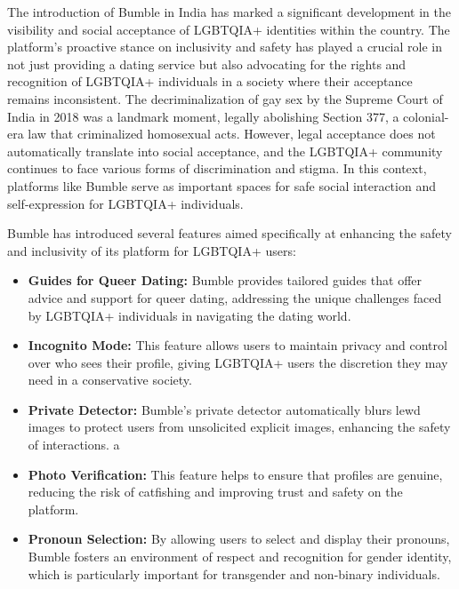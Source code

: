The introduction of Bumble in India has marked a significant development in the visibility and social acceptance of LGBTQIA+ identities within the country. The platform’s proactive stance on inclusivity and safety has played a crucial role in not just providing a dating service but also advocating for the rights and recognition of LGBTQIA+ individuals in a society where their acceptance remains inconsistent. The decriminalization of gay sex by the Supreme Court of India in 2018 \cite{Johar} was a landmark moment, legally abolishing Section 377, a colonial-era law that criminalized homosexual acts. However, legal acceptance does not automatically translate into social acceptance, and the LGBTQIA+ community continues to face various forms of discrimination and stigma. In this context, platforms like Bumble serve as important spaces for safe social interaction and self-expression for LGBTQIA+ individuals.

Bumble has introduced several features aimed specifically at enhancing the safety and inclusivity of its platform for LGBTQIA+ users:

\begin{itemize}
    \item \textbf{Guides for Queer Dating:} Bumble provides tailored guides that offer advice and support for queer dating, addressing the unique challenges faced by LGBTQIA+ individuals in navigating the dating world. \cite{Bumble}
    \item \textbf{Incognito Mode:} This feature allows users to maintain privacy and control over who sees their profile, giving LGBTQIA+ users the discretion they may need in a conservative society. \cite{Bumble_incognito}
    \item \textbf{Private Detector:} Bumble’s private detector automatically blurs lewd images to protect users from unsolicited explicit images, enhancing the safety of interactions. \cite{Bumble_private_detector}a
    \item \textbf{Photo Verification:} This feature helps to ensure that profiles are genuine, reducing the risk of catfishing and improving trust and safety on the platform. \cite{Bumble_photo_verification}
    \item \textbf{Pronoun Selection:} By allowing users to select and display their pronouns, Bumble fosters an environment of respect and recognition for gender identity, which is particularly important for transgender and non-binary individuals. \cite{Bumble_pronoun_feature}
\end{itemize}

